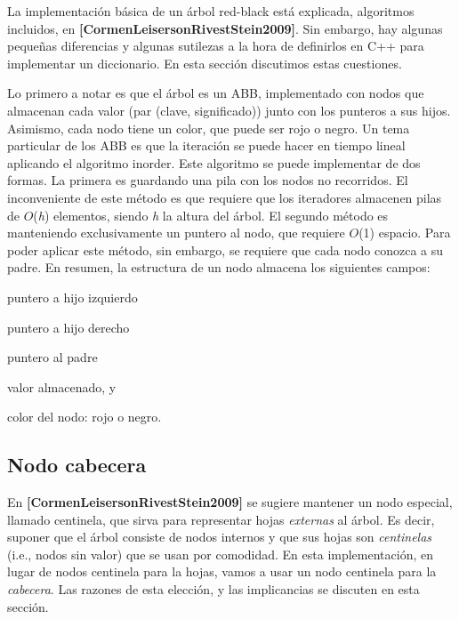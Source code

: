 La implementación básica de un árbol red-\/black está explicada, algoritmos incluidos, en {\bfseries [Cormen\+Leiserson\+Rivest\+Stein2009]}. Sin embargo, hay algunas pequeñas diferencias y algunas sutilezas a la hora de definirlos en C++ para implementar un diccionario. En esta sección discutimos estas cuestiones.

Lo primero a notar es que el árbol es un A\+BB, implementado con nodos que almacenan cada valor (par {\ttfamily (clave, significado)}) junto con los punteros a sus hijos. Asimismo, cada nodo tiene un color, que puede ser rojo o negro. Un tema particular de los A\+BB es que la iteración se puede hacer en tiempo lineal aplicando el algoritmo inorder. Este algoritmo se puede implementar de dos formas. La primera es guardando una pila con los nodos no recorridos. El inconveniente de este método es que requiere que los iteradores almacenen pilas de $O$({\itshape h}) elementos, siendo {\itshape h} la altura del árbol. El segundo método es manteniendo exclusivamente un puntero al nodo, que requiere $O$(1) espacio. Para poder aplicar este método, sin embargo, se requiere que cada nodo conozca a su padre. En resumen, la estructura de un nodo almacena los siguientes campos\+:
\begin{DoxyItemize}
\item puntero a hijo izquierdo
\item puntero a hijo derecho
\item puntero al padre
\item valor almacenado, y
\item color del nodo\+: rojo o negro.
\end{DoxyItemize}\hypertarget{Implementacion_Cabecera}{}\subsection{Nodo cabecera}\label{Implementacion_Cabecera}
En {\bfseries [Cormen\+Leiserson\+Rivest\+Stein2009]} se sugiere mantener un nodo especial, llamado centinela, que sirva para representar hojas {\itshape externas} al árbol. Es decir, suponer que el árbol consiste de nodos internos y que sus hojas son {\itshape centinelas} (i.\+e., nodos sin valor) que se usan por comodidad. En esta implementación, en lugar de nodos centinela para la hojas, vamos a usar un nodo centinela para la {\itshape cabecera}. Las razones de esta elección, y las implicancias se discuten en esta sección.

